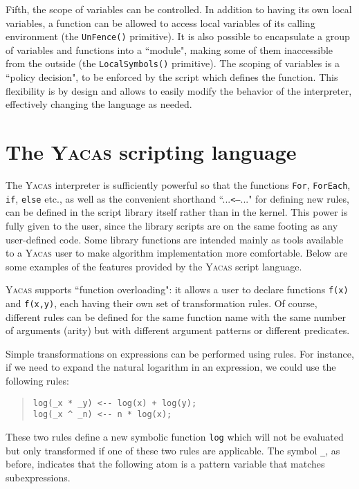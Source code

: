 \documentclass{llncs}
\begin{document}
Fifth, the scope of variables can be controlled. In addition to having its own
local variables, a function can be allowed to access local variables of its
calling environment (the \small{\texttt{UnFence()}} primitive).
It is also possible to encapsulate a group of variables and functions into a
``module", making some of them inaccessible from the outside (the \small{\texttt{LocalSymbols()}} primitive).
The scoping of variables is a ``policy decision", to be enforced by the script
which  defines the function. This flexibility is by design and allows to easily
modify the behavior of the interpreter, effectively changing the language
as needed.

\section{%
The \textsc{Yacas} scripting language}
The \textsc{Yacas} interpreter is sufficiently powerful so that the functions 
\small{\texttt{For}}, \small{\texttt{ForEach}}, \small{\texttt{if}}, \small{\texttt{else}} etc., as well as the convenient shorthand
``...\small{\texttt{<--}}..." for defining new rules, can be defined in the script library
itself rather than in the kernel. This power is fully given to the user, since
the library scripts are on the same footing as any user-defined code. Some
library functions are intended mainly as tools available to a \textsc{Yacas} user to
make algorithm implementation more comfortable. Below are some examples of the features provided by the \textsc{Yacas} script language.

\textsc{Yacas} supports ``function overloading": it allows a user to declare functions
\small{\texttt{f(x)}} and \small{\texttt{f(x,y)}}, each having their own set of transformation rules. Of
course, different rules can be defined for the same function name with the same
number of arguments (arity) but with different argument patterns or different
predicates.

Simple transformations on expressions can be performed using rules. For
instance, if we need to expand the natural logarithm in an expression, we could
use the following rules:

\begin{quote}\small\begin{verbatim}
log(_x * _y) <-- log(x) + log(y);
log(_x ^ _n) <-- n * log(x);
\end{verbatim}\end{quote}
These two rules define a new symbolic function \small{\texttt{log}} which will not be evaluated
but only transformed if one of these two rules are applicable. The symbol \small{\texttt{\_}}, as before, indicates that the following atom is a pattern variable that matches subexpressions.
\end{document}
